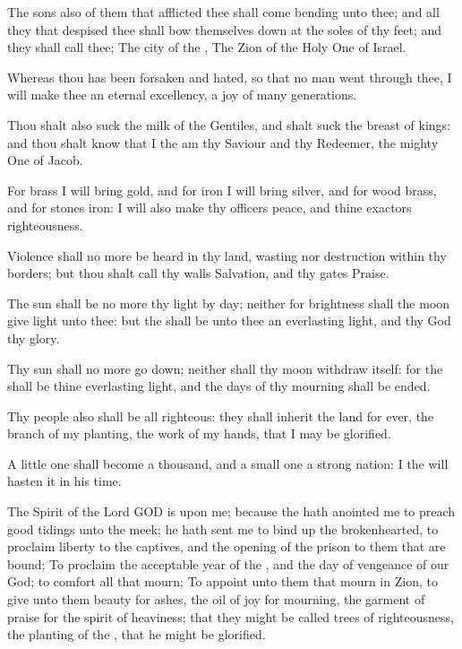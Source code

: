 \Verse The sons also of them that afflicted thee shall come bending unto thee; and all they that despised thee shall bow themselves down at the soles of thy feet; and they shall call thee; The city of the \LORD, The Zion of the Holy One of Israel.

\Verse Whereas thou has been forsaken and hated, so that no man went through thee, I will make thee an eternal excellency, a joy of many generations.

\Verse Thou shalt also suck the milk of the Gentiles, and shalt suck the breast of kings: and thou shalt know that I the \LORD am thy Saviour and thy Redeemer, the mighty One of Jacob.

\Verse For brass I will bring gold, and for iron I will bring silver, and for wood brass, and for stones iron: I will also make thy officers peace, and thine exactors righteousness.

\Verse Violence shall no more be heard in thy land, wasting nor destruction within thy borders; but thou shalt call thy walls Salvation, and thy gates Praise.

\Verse The sun shall be no more thy light by day; neither for brightness shall the moon give light unto thee: but the \LORD shall be unto thee an everlasting light, and thy God thy glory.

\Verse Thy sun shall no more go down; neither shall thy moon withdraw itself: for the \LORD shall be thine everlasting light, and the days of thy mourning shall be ended.

\Verse Thy people also shall be all righteous: they shall inherit the land for ever, the branch of my planting, the work of my hands, that I may be glorified.

\Verse A little one shall become a thousand, and a small one a strong nation: I the \LORD will hasten it in his time.


\Chapter
\Verse The Spirit of the Lord GOD is upon me; because the \LORD hath anointed me to preach good tidings unto the meek; he hath sent me to bind up the brokenhearted, to proclaim liberty to the captives, and the opening of the prison to them that are bound; \Verse To proclaim the acceptable year of the \LORD, and the day of vengeance of our God; to comfort all that mourn; \Verse To appoint unto them that mourn in Zion, to give unto them beauty for ashes, the oil of joy for mourning, the garment of praise for the spirit of heaviness; that they might be called trees of righteousness, the planting of the \LORD, that he might be glorified.

